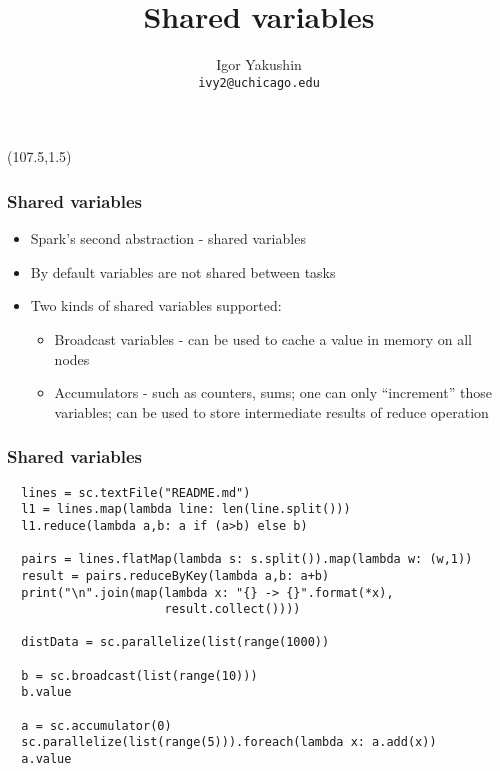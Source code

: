 \documentclass{beamer}
\title{\huge{Shared variables}}
\author{Igor Yakushin \\ \texttt{ivy2@uchicago.edu}}
\newcommand{\SPARK}{
\begin{textblock}{14}(107.5,1.5)
  \pgfuseimage{spark}
\end{textblock}
}
\begin{document}



\begin{frame}
\SPARK
\titlepage
\end{frame}

\begin{frame}
  \frametitle{Shared variables}
  \begin{itemize}
   \item Spark's second abstraction - {\color{mycolordef}shared variables}
   \item By default variables are not shared between tasks
   \item Two kinds of shared variables supported:
    \begin{itemize}
      \item {\color{mycolordef}Broadcast variables} - can be used to cache a value in memory on all nodes
      \item {\color{mycolordef}Accumulators} - such as counters, sums;
        one can only ``increment'' those variables; can be used to store intermediate results of reduce operation
    \end{itemize}	
  \end{itemize} 
\end{frame}


\begin{frame}[fragile]
  \frametitle{Shared variables}
{\small
{\color{mycolorcode}
\begin{verbatim}
  lines = sc.textFile("README.md")
  l1 = lines.map(lambda line: len(line.split()))
  l1.reduce(lambda a,b: a if (a>b) else b)

  pairs = lines.flatMap(lambda s: s.split()).map(lambda w: (w,1))
  result = pairs.reduceByKey(lambda a,b: a+b)
  print("\n".join(map(lambda x: "{} -> {}".format(*x), 
                      result.collect())))

  distData = sc.parallelize(list(range(1000))

  b = sc.broadcast(list(range(10)))
  b.value

  a = sc.accumulator(0)
  sc.parallelize(list(range(5))).foreach(lambda x: a.add(x))
  a.value
\end{verbatim}
}
}

\end{frame}
\end{document}

